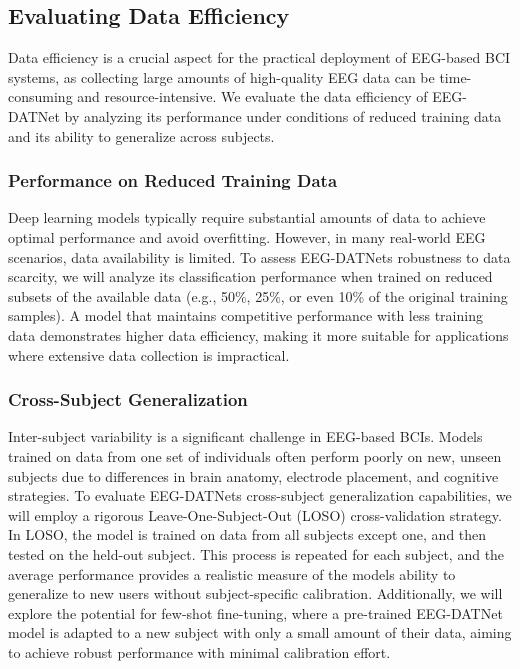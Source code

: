 \documentclass[pdflatex,sn-mathphys-num]{sn-jnl}
\theoremstyle{thmstyleone}%
\theoremstyle{thmstyletwo}%
\theoremstyle{thmstylethree}%
\begin{document}
\subsection{Evaluating Data Efficiency}

Data efficiency is a crucial aspect for the practical deployment of EEG-based BCI systems, as collecting large amounts of high-quality EEG data can be time-consuming and resource-intensive. We evaluate the data efficiency of EEG-DATNet by analyzing its performance under conditions of reduced training data and its ability to generalize across subjects.

\subsubsection{Performance on Reduced Training Data}

Deep learning models typically require substantial amounts of data to achieve optimal performance and avoid overfitting. However, in many real-world EEG scenarios, data availability is limited. To assess EEG-DATNet\textquotesingle s robustness to data scarcity, we will analyze its classification performance when trained on reduced subsets of the available data (e.g., 50\%, 25\%, or even 10\% of the original training samples). A model that maintains competitive performance with less training data demonstrates higher data efficiency, making it more suitable for applications where extensive data collection is impractical.

\subsubsection{Cross-Subject Generalization}

Inter-subject variability is a significant challenge in EEG-based BCIs. Models trained on data from one set of individuals often perform poorly on new, unseen subjects due to differences in brain anatomy, electrode placement, and cognitive strategies. To evaluate EEG-DATNet\textquotesingle s cross-subject generalization capabilities, we will employ a rigorous Leave-One-Subject-Out (LOSO) cross-validation strategy. In LOSO, the model is trained on data from all subjects except one, and then tested on the held-out subject. This process is repeated for each subject, and the average performance provides a realistic measure of the model\textquotesingle s ability to generalize to new users without subject-specific calibration. Additionally, we will explore the potential for few-shot fine-tuning, where a pre-trained EEG-DATNet model is adapted to a new subject with only a small amount of their data, aiming to achieve robust performance with minimal calibration effort.
\end{document}
